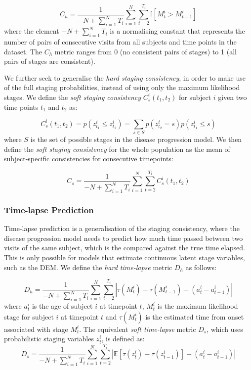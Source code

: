 \begin{equation}
 C_h = \frac{1}{-N +\sum_{i=1}^N T_i} \sum_{i=1}^N \sum_{t=2}^{T_i} \mathbb{I}[M^i_t > M^i_{t-1}] 
\end{equation}
where the element $-N +\sum_{i=1}^N T_i$ is a normalising constant that represents the number of pairs of consecutive visits from all subjects and time points in the dataset. The $C_h$ metric ranges from 0 (no consistent pairs of stages) to 1 (all pairs of stages are consistent).


We further seek to generalise the \emph{hard staging consistency}, in order to make use of the full staging probabilities, instead of using only the maximum likelihood stages. We define the \emph{soft staging consistency} $C_s^i(t_1,t_2)$ for subject $i$ given two time points $t_1$ and $t_2$ as:

\begin{equation}
C_s^i(t_1,t_2) = p(z^i_{t_1} \leq z^i_{t_2}) = \sum_{s \in S} p(z^i_{t_2} = s) p(z^i_{t_1} \leq s) 
\end{equation}
where $S$ is the set of possible stages in the disease progression model. We then define the \emph{soft staging consistency} for the whole population as the mean of subject-specific consistencies for consecutive timepoints:

\begin{equation}
C_s = \frac{1}{-N +\sum_{i=1}^N T_i} \sum_{i=1}^N \sum_{t=2}^{T_i} C_s^i(t_1,t_2) 
\end{equation}

\subsubsection{Time-lapse Prediction}
\label{sec:timeLapse}

Time-lapse prediction is a generalisation of the staging consistency, where the disease progression model needs to predict how much time passed between two visits of the same subject, which is the compared against the true time elapsed. This is only possible for models that estimate continuous latent stage variables, such as the DEM. We define the \emph{hard time-lapse} metric $D_h$ as follows:

\begin{equation}
D_h = \frac{1}{-N +\sum_{i=1}^N T_i} \sum_{i=1}^N \sum_{t=2}^{T_i} \left| \tau(M^i_t) - \tau(M^i_{t-1}) - (a^i_t - a^i_{t-1}) \right|
\end{equation}
where $a^i_t$ is the age of subject $i$ at timepoint $t$, $M^i_t$ is the maximum likelihood stage for subject $i$ at timepoint $t$ and $\tau(M^i_t)$ is the estimated time from onset associated with stage $M^i_t$. The equivalent \emph{soft time-lapse} metric $D_s$, which uses probabilistic staging variables $z_t^i$, is defined as:
\begin{equation}
D_s = \frac{1}{-N +\sum_{i=1}^N T_i} \sum_{i=1}^N \sum_{t=2}^{T_i} \left| \mathbb{E}[\tau(z^i_t) - \tau(z^i_{t-1})] - (a^i_t - a^i_{t-1}) \right|
\end{equation}

